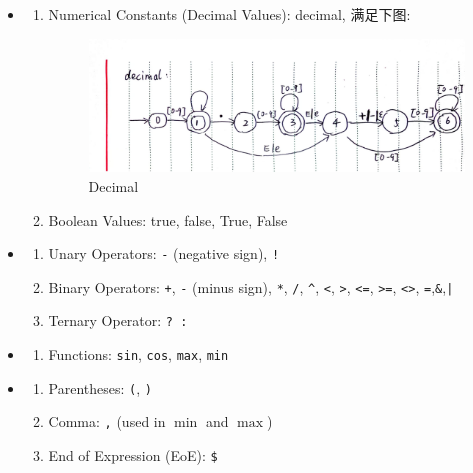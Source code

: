 \documentclass{article}
\begin{document}
\begin{itemize}
    \item {}
          \begin{enumerate}
              \item Numerical Constants (Decimal Values): decimal, 满足下图:
                    \begin{figure}[H]
                        \centering \includegraphics[width=0.5\linewidth]{14.png}
                        \caption{Decimal}
                        \label{fig:decimal}
                    \end{figure}
              \item Boolean Values: true, false, True, False
          \end{enumerate}
    \item {}
          \begin{enumerate}
              \item Unary Operators: \texttt{-} (negative sign), \texttt{!}
              \item Binary Operators: \texttt{+}, \texttt{-} (minus sign), \texttt{*}, \texttt{/},
                    \texttt{\textasciicircum}, \texttt{\textless}, \texttt{\textgreater},
                    \texttt{\textless=}, \texttt{\textgreater=}, \texttt{\textless \textgreater}, \texttt{=},\texttt{\&},\texttt{|}
              \item Ternary Operator: \texttt{? :}
          \end{enumerate}

    \item {}
          \begin{enumerate}
              \item Functions: \texttt{sin}, \texttt{cos}, \texttt{max}, \texttt{min}
          \end{enumerate}

    \item {}
          \begin{enumerate}
              \item Parentheses: \texttt{(}, \texttt{)}
              \item Comma: \texttt{,} (used in $\min$ and $\max$)
              \item End of Expression (EoE): \texttt{\$}
          \end{enumerate}
\end{itemize}
\newpage
\end{document}

